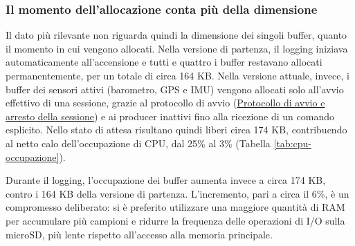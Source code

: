 \subsubsection{Il momento dell'allocazione conta più della dimensione}
Il dato più rilevante non riguarda quindi la dimensione dei singoli buffer,
quanto il momento in cui vengono allocati. Nella versione di partenza, il
logging iniziava automaticamente all'accensione e tutti e quattro i buffer
restavano allocati permanentemente, per un totale di circa 164 KB. Nella
versione attuale, invece, i buffer dei sensori attivi (barometro, GPS e IMU)
vengono allocati solo all'avvio effettivo di una sessione, grazie al protocollo
di avvio (\hyperref[sec:avvio-arresto]{Protocollo di avvio e arresto della
sessione}) e ai producer inattivi fino alla ricezione di un comando esplicito.
Nello stato di attesa risultano quindi liberi circa 174 KB, contribuendo al
netto calo dell'occupazione di CPU, dal 25\% al 3\%
(Tabella \ref{tab:cpu-occupazione}).

Durante il logging, l'occupazione dei buffer aumenta invece a circa 174 KB,
contro i 164 KB della versione di partenza. L'incremento, pari a circa il 6\%,
è un compromesso deliberato: si è preferito utilizzare una maggiore quantità
di RAM per accumulare più campioni e ridurre la frequenza delle operazioni di
I/O sulla microSD, più lente rispetto all'accesso alla memoria principale.

\newpage